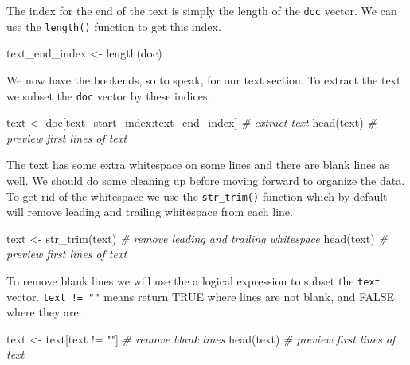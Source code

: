 \documentclass[
  letterpaper,
  DIV=11,
  numbers=noendperiod]{scrreport}
\newenvironment{Shaded}{\begin{snugshade}}{\end{snugshade}}
\newcommand{\CommentTok}[1]{\textcolor[rgb]{0.00,0.00,0.00}{\textit{#1}}}
\newcommand{\FunctionTok}[1]{\textcolor[rgb]{0.00,0.00,0.00}{#1}}
\newcommand{\NormalTok}[1]{\textcolor[rgb]{0.00,0.00,0.00}{#1}}
\newcommand{\OtherTok}[1]{\textcolor[rgb]{0.00,0.00,0.00}{#1}}
\newcommand{\SpecialCharTok}[1]{\textcolor[rgb]{0.00,0.00,0.00}{#1}}
\newcommand{\StringTok}[1]{\textcolor[rgb]{0.00,0.00,0.00}{#1}}
\theoremstyle{definition}
\theoremstyle{remark}
\begin{document}
The index for the end of the text is simply the length of the
\texttt{doc} vector. We can use the \texttt{length()} function to get
this index.

\begin{Shaded}
\begin{Highlighting}[]
\NormalTok{text\_end\_index }\OtherTok{\textless{}{-}} \FunctionTok{length}\NormalTok{(doc)}
\end{Highlighting}
\end{Shaded}

We now have the bookends, so to speak, for our text section. To extract
the text we subset the \texttt{doc} vector by these indices.

\begin{Shaded}
\begin{Highlighting}[]
\NormalTok{text }\OtherTok{\textless{}{-}}\NormalTok{ doc[text\_start\_index}\SpecialCharTok{:}\NormalTok{text\_end\_index] }\CommentTok{\# extract text}
\FunctionTok{head}\NormalTok{(text) }\CommentTok{\# preview first lines of \textasciigrave{}text\textasciigrave{}}
\end{Highlighting}
\end{Shaded}

The text has some extra whitespace on some lines and there are blank
lines as well. We should do some cleaning up before moving forward to
organize the data. To get rid of the whitespace we use the
\texttt{str\_trim()} function which by default will remove leading and
trailing whitespace from each line.

\begin{Shaded}
\begin{Highlighting}[]
\NormalTok{text }\OtherTok{\textless{}{-}} \FunctionTok{str\_trim}\NormalTok{(text) }\CommentTok{\# remove leading and trailing whitespace}
\FunctionTok{head}\NormalTok{(text) }\CommentTok{\# preview first lines of \textasciigrave{}text\textasciigrave{}}
\end{Highlighting}
\end{Shaded}

To remove blank lines we will use the a logical expression to subset the
\texttt{text} vector. \texttt{text\ !=\ ""} means return TRUE where
lines are not blank, and FALSE where they are.

\begin{Shaded}
\begin{Highlighting}[]
\NormalTok{text }\OtherTok{\textless{}{-}}\NormalTok{ text[text }\SpecialCharTok{!=} \StringTok{""}\NormalTok{] }\CommentTok{\# remove blank lines}
\FunctionTok{head}\NormalTok{(text) }\CommentTok{\# preview first lines of \textasciigrave{}text\textasciigrave{}}
\end{Highlighting}
\end{Shaded}
\end{document}
